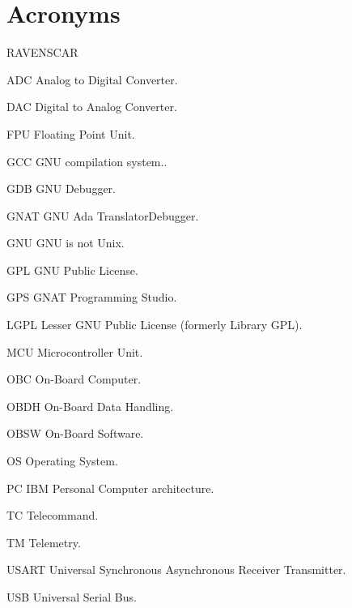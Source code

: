 \section*{Acronyms}

\begin{entry}{RAVENSCAR}
\item[ADC] Analog to Digital Converter.
\item[DAC] Digital to Analog Converter.
\item[FPU] Floating Point Unit.
\item[GCC] GNU compilation system..
\item[GDB] GNU Debugger.
\item[GNAT] GNU Ada TranslatorDebugger.
\item[GNU] GNU is not Unix.
\item[GPL] GNU Public License.
\item[GPS] GNAT Programming Studio.
\item[LGPL] Lesser GNU Public License (formerly Library GPL).
\item[MCU] Microcontroller Unit.
\item[OBC] On-Board Computer.
\item[OBDH] On-Board Data Handling.
\item[OBSW] On-Board Software.
\item[OS] Operating System.
\item[PC] IBM Personal Computer architecture.
\item[TC] Telecommand.
\item[TM] Telemetry.
\item[USART] Universal Synchronous Asynchronous Receiver Transmitter.
\item[USB] Universal Serial Bus.
\end{entry}

